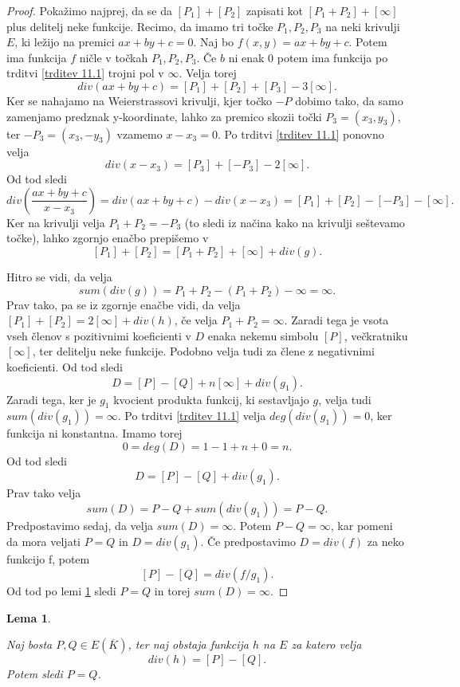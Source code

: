 \documentclass[12pt,a4paper,twoside]{article}
\theoremstyle{definition} %
\theoremstyle{plain} %
\newtheorem{lema}[definicija]{Lema}
\numberwithin{equation}{section}  %
\newcommand{\E}[1]{E({#1})}
\begin{document}
\begin{proof}

Pokažimo najprej, da se da $[P_1]+ [P_2]$ zapisati kot $[P_1+P_2] + [\infty]$ plus delitelj neke funkcije.
Recimo, da imamo tri točke $P_1,P_2,P_3$ na neki krivulji $E$, ki ležijo na premici $ax+by+c = 0$.
Naj bo $f(x,y) = ax+by+c$. Potem ima funkcija $f$ ničle v točkah $P_1,P_2,P_3$. Če $b$ ni enak $0$ potem ima funkcija po trditvi \ref{trditev 11.1} trojni pol v $\infty$.
Velja torej $$div(ax+by+c) = [P_1]+[P_2]+[P_3]-3[\infty].$$
Ker se nahajamo na Weierstrassovi krivulji, kjer točko $-P$ dobimo tako, da samo zamenjamo predznak y-koordinate, lahko za premico skozii točki $P_3 = (x_3,y_3)$, ter $-P_3=(x_3,-y_3)$ vzamemo $x-x_3=0$.
Po  trditvi \ref{trditev 11.1} ponovno velja
$$div(x-x_3) = [P_3]+[-P_3]-2[\infty].$$
Od tod sledi
$$div\left( \frac{ax+by+c}{x-x_3}\right) = div(ax+by+c) - div(x-x_3) =[P_1]+[P_2]-[-P_3]-[\infty].$$
Ker na krivulji velja $P_1+P_2 = -P_3$ (to sledi iz načina kako na krivulji seštevamo točke), lahko zgornjo enačbo prepišemo v 
$$[P_1]+[P_2] = [P_1+P_2]+[\infty]+div(g).$$ 


Hitro se vidi, da velja
$$sum(div(g))= P_1+P_2-(P_1+P_2)-\infty = \infty.$$
Prav tako, pa se iz zgornje enačbe vidi, da velja $[P_1]+[P_2] = 2[\infty] + div(h)$, če velja $P_1+P_2 = \infty$. Zaradi tega je vsota vseh členov s pozitivnimi koeficienti v $D$ enaka nekemu simbolu $[P]$, večkratniku $[\infty]$, ter delitelju neke funkcije. Podobno velja tudi za člene z negativnimi koeficienti. Od tod sledi
$$D = [P]-[Q]+n[\infty]+div(g_1).$$
Zaradi tega, ker je $g_1$ kvocient produkta funkcij, ki sestavljajo $g$, velja tudi
\newline $sum(div(g_1))= \infty$. Po trditvi \ref{trditev 11.1} velja $deg(div(g_1))=0$, ker funkcija ni konstantna. Imamo torej $$0 = deg(D) = 1-1+n+0=n.$$
Od tod sledi
$$D = [P]-[Q] + div(g_1).$$
Prav tako velja
$$sum(D) = P-Q+sum(div(g_1)) = P-Q.$$
Predpostavimo sedaj, da velja $sum(D) = \infty$. Potem $P-Q = \infty$, kar pomeni da mora veljati $P=Q$ in $D = div(g_1)$. Če predpostavimo $D = div(f)$ za neko funkcijo f, potem
$$[P]-[Q] = div(f/g_1).$$
Od tod po lemi \ref{lema 11.3} sledi $P = Q$ in torej $sum(D) = \infty$.

\end{proof}

\begin{lema}
\label{lema 11.3}

Naj bosta $P,Q \in \E{\overline{K}}$, ter naj obstaja funkcija $h$ na $E$ za katero velja
$$div(h)=[P]-[Q].$$
Potem sledi $P=Q$.
\end{lema}
\end{document}
